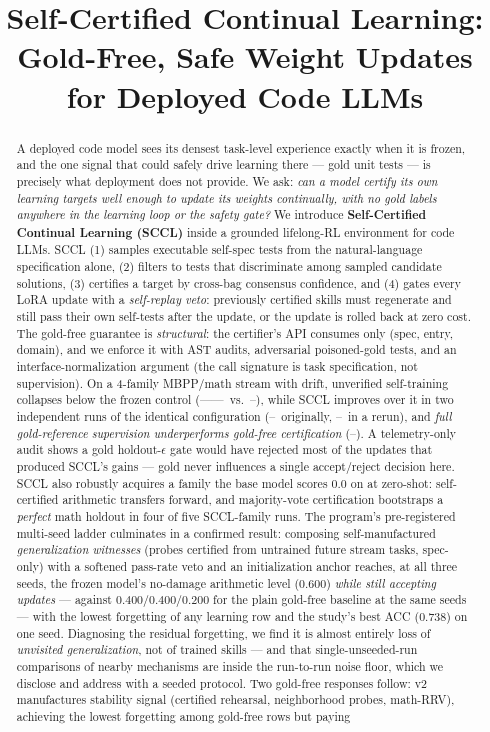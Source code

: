 \documentclass[10pt,conference]{IEEEtran}
\title{Self-Certified Continual Learning:\\Gold-Free, Safe Weight Updates for Deployed Code LLMs}
\author{\IEEEauthorblockN{OpenContinualEnv Research}
\IEEEauthorblockA{Corresponding repository: \texttt{open\_continual\_env} (module \texttt{gcl})}
}
\newcommand{\frozenacc}{--}\newcommand{\frozenbwt}{--}\newcommand{\frozenfwt}{--}%
\newcommand{\selfdistillacc}{--}\newcommand{\selfdistillbwt}{--}\newcommand{\selfdistillfwt}{--}%
\newcommand{\execfilteracc}{--}\newcommand{\execfilterbwt}{--}\newcommand{\execfilterfwt}{--}%
\newcommand{\scclacc}{--}\newcommand{\scclbwt}{--}\newcommand{\scclfwt}{--}%
\newcommand{\vsracc}{--}\newcommand{\vsrbwt}{--}\newcommand{\vsrfwt}{--}%
\newcommand{\vtwoscclacc}{--}\newcommand{\vtwoscclbwt}{--}\newcommand{\vtwoscclforget}{--}\newcommand{\vtwoscclfrontier}{--}%
\begin{document}
\maketitle

\begin{abstract}
A deployed code model sees its densest task-level experience exactly when it is frozen, and the one signal that could safely drive learning there --- gold unit tests --- is precisely what deployment does not provide. We ask: \emph{can a model certify its own learning targets well enough to update its weights continually, with no gold labels anywhere in the learning loop or the safety gate?} We introduce \textbf{Self-Certified Continual Learning (SCCL)} inside a grounded lifelong-RL environment for code LLMs. SCCL (1) samples executable self-spec tests from the natural-language specification alone, (2) filters to tests that discriminate among sampled candidate solutions, (3) certifies a target by cross-bag consensus confidence, and (4) gates every LoRA update with a \emph{self-replay veto}: previously certified skills must regenerate and still pass their own self-tests after the update, or the update is rolled back at zero cost. The gold-free guarantee is \emph{structural}: the certifier's API consumes only (spec, entry, domain), and we enforce it with AST audits, adversarial poisoned-gold tests, and an interface-normalization argument (the call signature is task specification, not supervision). On a 4-family MBPP/math stream with drift, unverified self-training collapses below the frozen control (\selfdistillacc--\execfilteracc\ vs.\ \frozenacc), while SCCL improves over it in two independent runs of the identical configuration (\scclacc\ originally, \vtwoscclacc\ in a rerun), and \emph{full gold-reference supervision underperforms gold-free certification} (\vsracc). A telemetry-only audit shows a gold holdout-$\epsilon$ gate would have rejected most of the updates that produced SCCL's gains --- gold never influences a single accept/reject decision here. SCCL also robustly acquires a family the base model scores 0.0 on at zero-shot: self-certified arithmetic transfers forward, and majority-vote certification bootstraps a \emph{perfect} math holdout in four of five SCCL-family runs. The program's pre-registered multi-seed ladder culminates in a confirmed result: composing self-manufactured \emph{generalization witnesses} (probes certified from untrained future stream tasks, spec-only) with a softened pass-rate veto and an initialization anchor reaches, at all three seeds, the frozen model's no-damage arithmetic level ($0.600$) \emph{while still accepting updates} --- against $0.400/0.400/0.200$ for the plain gold-free baseline at the same seeds --- with the lowest forgetting of any learning row and the study's best ACC ($0.738$) on one seed. Diagnosing the residual forgetting, we find it is almost entirely loss of \emph{unvisited generalization}, not of trained skills --- and that single-unseeded-run comparisons of nearby mechanisms are inside the run-to-run noise floor, which we disclose and address with a seeded protocol. Two gold-free responses follow: v2 manufactures stability signal (certified rehearsal, neighborhood probes, math-RRV), achieving the lowest forgetting among gold-free rows but paying 
\end{abstract}
\end{document}
